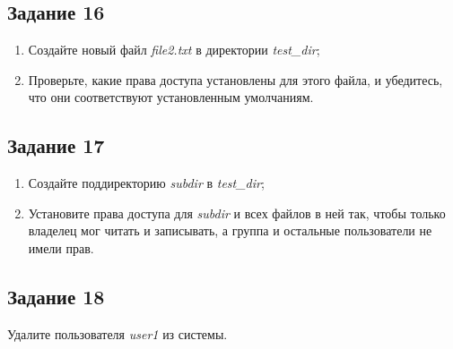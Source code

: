 \documentclass[12pt, a4paper]{report}
\begin{document}
	\subsection*{Задание 16}
	\begin{enumerate}
		\item Создайте новый файл \textit{file2.txt} в директории \textit{test\_dir};
		\item Проверьте, какие права доступа установлены для этого файла, и убедитесь, что они соответствуют установленным умолчаниям.
	\end{enumerate}
	\lstset{style=mystyle}
	

	\subsection*{Задание 17}
	\begin{enumerate}
		\item Создайте поддиректорию \textit{subdir} в \textit{test\_dir};
		\item Установите права доступа для \textit{subdir} и всех файлов в ней так, чтобы только владелец мог читать и записывать, а группа и остальные пользователи не имели прав.
	\end{enumerate}
	\lstset{style=mystyle}
	

	\subsection*{Задание 18}
	Удалите пользователя \textit{user1} из системы.
	\lstset{style=mystyle}
	
\end{document}
